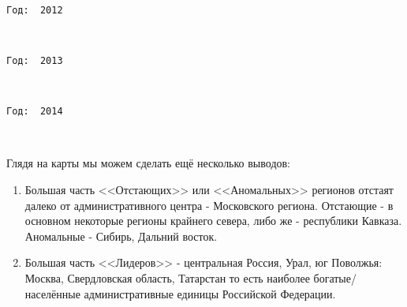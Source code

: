 \documentclass[11pt]{article}
\begin{document}
    \begin{center}
    \end{center}
    { \hspace*{\fill} \\}
    
    \begin{Verbatim}[commandchars=\\\{\}]
Год:  2012

    \end{Verbatim}

    \begin{center}
    \end{center}
    { \hspace*{\fill} \\}
    
    \begin{Verbatim}[commandchars=\\\{\}]
Год:  2013

    \end{Verbatim}

    \begin{center}
    \end{center}
    { \hspace*{\fill} \\}
    
    \begin{Verbatim}[commandchars=\\\{\}]
Год:  2014

    \end{Verbatim}

    \begin{center}
    \end{center}
    { \hspace*{\fill} \\}
    
    Глядя на карты мы можем сделать ещё несколько выводов:

\begin{enumerate}
\item Большая часть <<Отстающих>> или <<Аномальных>> регионов отстаят далеко от административного центра - Московского региона. Отстающие - в основном некоторые регионы крайнего севера, либо же - республики Кавказа. Аномальные - Сибирь, Дальний восток.
\item Большая часть <<Лидеров>> - центральная Россия, Урал, юг Поволжья: Москва, Свердловская область, Татарстан то есть наиболее богатые/населённые  административные единицы Российской Федерации.
\end{enumerate}
\end{document}
